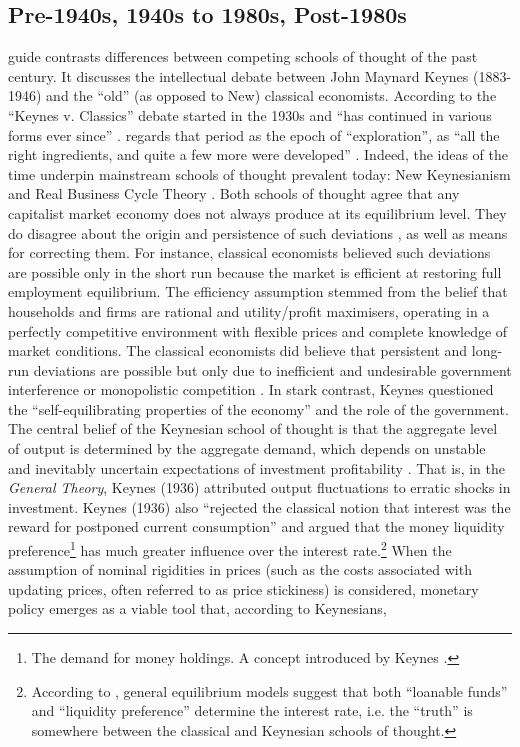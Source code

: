 \subsection{Pre-1940s, 1940s to 1980s, Post-1980s}
\textcite{snowdon_1994_a} guide contrasts differences between competing schools of thought of the past century. It discusses the intellectual debate between John Maynard Keynes (1883-1946) and the ``old'' (as opposed to New) classical economists. According to \citereset\textcite[42]{snowdon_1994_a} the ``Keynes v. Classics'' debate started in the 1930s and ``has continued in various forms ever since'' \parencite[42]{snowdon_1994_a}. \textcite{blanchard_2000_what} regards that period as the epoch of ``exploration'', as ``all the right ingredients, and quite a few more were developed'' \parencite[1376]{blanchard_2000_what}. Indeed, the ideas of the time underpin mainstream schools of thought prevalent today: New Keynesianism and Real Business Cycle Theory \parencites[1]{jordigal_2015_monetary}[42]{snowdon_1994_a}. Both schools of thought agree that any capitalist market economy does not always produce at its equilibrium level. They do disagree about the origin and persistence of such deviations \parencite[43]{snowdon_1994_a}, as well as means for correcting them. For instance, classical economists believed such deviations are possible only in the short run because the market is efficient at restoring full employment equilibrium. The efficiency assumption stemmed from the belief that households and firms are rational and utility/profit maximisers, operating in a perfectly competitive environment with flexible prices and complete knowledge of market conditions. The classical economists did believe that persistent and long-run deviations are possible but only due to inefficient and undesirable government interference or monopolistic competition \parencite[43]{snowdon_1994_a}. In stark contrast, Keynes questioned the ``self-equilibrating properties of the economy'' \parencite[89]{snowdon_1994_a} and the role of the government. The central belief of the Keynesian school of thought is that the aggregate level of output is determined by the aggregate demand, which depends on unstable and inevitably uncertain expectations of investment profitability \parencite[65]{snowdon_1994_a}. That is, in the \textit{General Theory}, Keynes (1936) attributed output fluctuations to erratic shocks in investment. Keynes (1936) also ``rejected the classical notion that interest was the reward for postponed current consumption'' \parencite[66]{snowdon_1994_a} and argued that the money liquidity preference\footnote{The demand for money holdings. A concept introduced by Keynes \parencite[66]{snowdon_1994_a}.} has much greater influence over the interest rate.\footnote{According to \textcite[1380]{blanchard_2000_what}, general equilibrium models suggest that both ``loanable funds'' and ``liquidity preference'' determine the interest rate, i.e. the ``truth'' is somewhere between the classical and Keynesian schools of thought.} When the assumption of nominal rigidities in prices (such as the costs associated with updating prices, often referred to as price stickiness) is considered, monetary policy emerges as a viable tool that, according to Keynesians, 